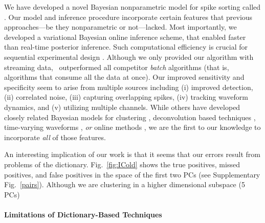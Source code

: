 
We have developed a novel Bayesian nonparametric model for spike sorting called \smug.  Our model and inference procedure incorporate certain features that previous approaches---be they nonparametric or not---lacked.  Most importantly, we developed a variational Bayesian online inference scheme, that enabled faster than real-time posterior inference.  Such computational efficiency is crucial for sequential experimental design \cite{}.  Although we only provided our algorithm with streaming data, \smug\ outperformed all competitor \emph{batch} algorithms (that is, algorithms that consume all the data at once). Our improved sensitivity and specificity seem to arise from multiple sources including (i) improved detection, (ii) correlated noise, (iii) capturing overlapping spikes, (iv) tracking waveform dynamics, and (v) utilizing multiple channels.  While others have developed closely related Bayesian models for clustering \cite{WoodBla2008,wood2009}, deconvolution based techniques \cite{Pillow2013}, time-varying waveforms \cite{calabrese2011kalman},  \emph{or} online methods \cite{OSORT, Franke2010}, we are the first to our knowledge to incorporate \emph{all} of those features.

An interesting implication of our work is that it seems that our errors result from problems of the dictionary.  Fig.\ \ref{fig:ICold} shows the true positives, missed positives, and false positives in the space of the first two PCs (see Supplementary Fig.\ \ref{pairs}). Although we are clustering in a higher dimensional subspace (5 PCs) 

\paragraph{Limitations of Dictionary-Based Techniques} \label{sub:template}
\vspace{-5pt}


